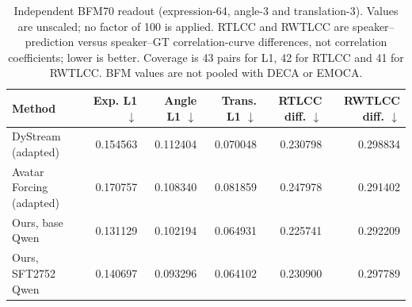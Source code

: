 \begin{table}[t]
\centering\small
\caption{Independent BFM70 readout (expression-64, angle-3 and translation-3). Values are unscaled; no factor of 100 is applied. RTLCC and RWTLCC are speaker--prediction versus speaker--GT correlation-curve differences, not correlation coefficients; lower is better. Coverage is 43 pairs for L1, 42 for RTLCC and 41 for RWTLCC. BFM values are not pooled with DECA or EMOCA.}
\label{tab:vico43-bfm}
\setlength{\tabcolsep}{4pt}
\begin{tabular}{lrrrrr}
\toprule
Method & Exp. L1 $\downarrow$ & Angle L1 $\downarrow$ & Trans. L1 $\downarrow$ & RTLCC diff. $\downarrow$ & RWTLCC diff. $\downarrow$ \\
\midrule
DyStream (adapted) & 0.154563 & 0.112404 & 0.070048 & 0.230798 & 0.298834 \\
Avatar Forcing (adapted) & 0.170757 & 0.108340 & 0.081859 & 0.247978 & 0.291402 \\
Ours, base Qwen & 0.131129 & 0.102194 & 0.064931 & 0.225741 & 0.292209 \\
Ours, SFT2752 Qwen & 0.140697 & 0.093296 & 0.064102 & 0.230900 & 0.297789 \\
\bottomrule
\end{tabular}
\end{table}
